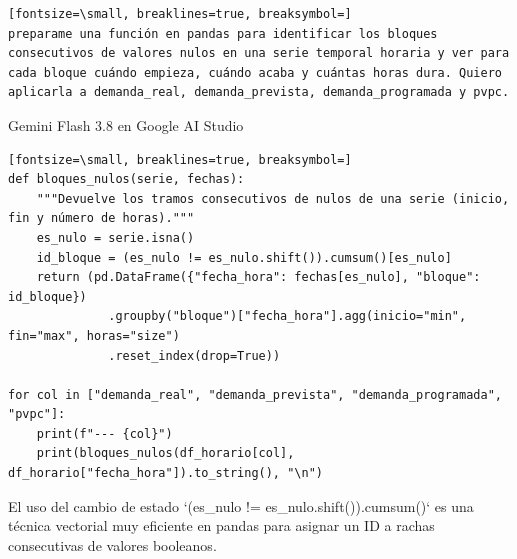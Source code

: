 \documentclass[12pt,a4paper,oneside]{book}
\begin{document}
\begin{iaprompt}
\begin{Verbatim}[fontsize=\small, breaklines=true, breaksymbol=]
preparame una función en pandas para identificar los bloques consecutivos de valores nulos en una serie temporal horaria y ver para cada bloque cuándo empieza, cuándo acaba y cuántas horas dura. Quiero aplicarla a demanda_real, demanda_prevista, demanda_programada y pvpc.
\end{Verbatim}
\end{iaprompt}
\begin{iaresp}{Gemini Flash 3.8 en Google AI Studio}
\begin{Verbatim}[fontsize=\small, breaklines=true, breaksymbol=]
def bloques_nulos(serie, fechas):
    """Devuelve los tramos consecutivos de nulos de una serie (inicio, fin y número de horas)."""
    es_nulo = serie.isna()
    id_bloque = (es_nulo != es_nulo.shift()).cumsum()[es_nulo]
    return (pd.DataFrame({"fecha_hora": fechas[es_nulo], "bloque": id_bloque})
              .groupby("bloque")["fecha_hora"].agg(inicio="min", fin="max", horas="size")
              .reset_index(drop=True))

for col in ["demanda_real", "demanda_prevista", "demanda_programada", "pvpc"]:
    print(f"--- {col}")
    print(bloques_nulos(df_horario[col], df_horario["fecha_hora"]).to_string(), "\n")
\end{Verbatim}
\end{iaresp}
\begin{iaanalisis}
El uso del cambio de estado `(es_nulo != es_nulo.shift()).cumsum()` es una técnica vectorial muy eficiente en pandas para asignar un ID a rachas consecutivas de valores booleanos.
\end{iaanalisis}
\end{document}
